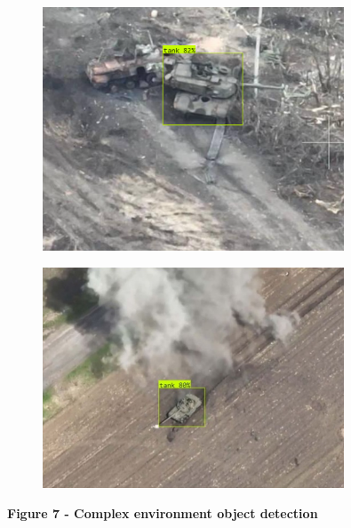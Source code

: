 \begin{figure}[H]
	\centering
	\includegraphics[width=0.8\textwidth]{assets/21}
	\caption*{}
\end{figure}\begin{figure}[H]
	\centering
	\includegraphics[width=0.8\textwidth]{assets/22}
	\caption*{}
\end{figure}

{\bfseries Figure 7 - Complex environment object detection}

